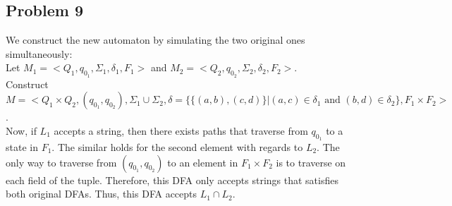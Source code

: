 \documentclass[english]{article}
\begin{document}
\subsection*{Problem 9}
We construct the new automaton by simulating the two original ones simultaneously:\\
Let $M_1 = <Q_1, q_{0_1}, \Sigma_1, \delta_1, F_1>$ and $M_2 = <Q_2, q_{0_2}, \Sigma_2, \delta_2, F_2>$.\\
Construct $M = <Q_1 \times Q_2, (q_{0_1}, q_{0_2}), \Sigma_1 \cup \Sigma_2, \delta = \{\{(a,b), (c,d)\}|(a,c) \in \delta_1 \text{ and } (b,d) \in \delta_2\}, F_1 \times F_2>$.\\
Now, if $L_1$ accepts a string, then there exists paths that traverse from $q_{0_1}$ to a state in $F_1$. The similar holds for the second element with regards to $L_2$. The only way to traverse from $(q_{0_1}, q_{0_2})$ to an element in $F_1 \times F_2$ is to traverse on each field of the tuple. Therefore, this DFA only accepts strings that satisfies both original DFAs. Thus, this DFA accepts $L_1 \cap L_2$.
\end{document}
